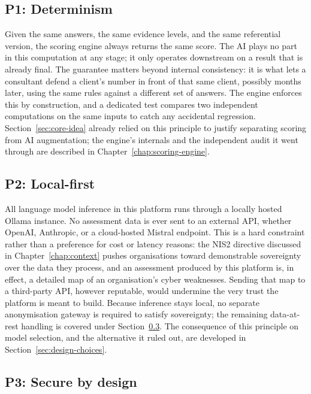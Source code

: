\subsection{P1: Determinism}
\label{principle:determinism}

Given the same answers, the same evidence levels, and the same referential
version, the scoring engine always returns the same score. The AI plays no
part in this computation at any stage; it only operates downstream on a
result that is already final. The guarantee matters beyond internal
consistency: it is what lets a consultant defend a client's number in
front of that same client, possibly months later, using the same rules
against a different set of answers. The engine enforces this by
construction, and a dedicated test compares two independent computations
on the same inputs to catch any accidental regression. Section~\ref{sec:core-idea}
already relied on this principle to justify separating scoring from AI
augmentation; the engine's internals and the independent audit it went
through are described in Chapter~\ref{chap:scoring-engine}.

\subsection{P2: Local-first}
\label{principle:local-first}

All language model inference in this platform runs through a locally
hosted Ollama instance. No assessment data is ever sent to an external
API, whether OpenAI, Anthropic, or a cloud-hosted Mistral endpoint. This
is a hard constraint rather than a preference for cost or latency reasons:
the NIS2 directive discussed in Chapter~\ref{chap:context} pushes
organisations toward demonstrable sovereignty over the data they process,
and an assessment produced by this platform is, in effect, a detailed map
of an organisation's cyber weaknesses. Sending that map to a third-party
API, however reputable, would undermine the very trust the platform is
meant to build. Because inference stays local, no separate anonymisation
gateway is required to satisfy sovereignty; the remaining data-at-rest
handling is covered under Section~\ref{principle:secure-by-design}. The
consequence of this principle on model selection, and the alternative it
ruled out, are developed in Section~\ref{sec:design-choices}.

\subsection{P3: Secure by design}
\label{principle:secure-by-design}

